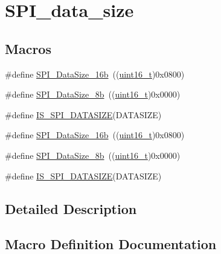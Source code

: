 \hypertarget{group___s_p_i__data__size}{}\section{S\+P\+I\+\_\+data\+\_\+size}
\label{group___s_p_i__data__size}
\subsection*{Macros}
\begin{DoxyCompactItemize}
\item 
\#define \hyperlink{group___s_p_i__data__size_ga8af2c8ca5c2162423531ebf560e0a41d}{S\+P\+I\+\_\+\+Data\+Size\+\_\+16b}~((\hyperlink{_p_e___types_8h_a1f1825b69244eb3ad2c7165ddc99c956}{uint16\+\_\+t})0x0800)
\item 
\#define \hyperlink{group___s_p_i__data__size_ga56721814a935922b6ca7c49060509765}{S\+P\+I\+\_\+\+Data\+Size\+\_\+8b}~((\hyperlink{_p_e___types_8h_a1f1825b69244eb3ad2c7165ddc99c956}{uint16\+\_\+t})0x0000)
\item 
\#define \hyperlink{group___s_p_i__data__size_gab6f9f528f7eb70373b9caf3548e44e67}{I\+S\+\_\+\+S\+P\+I\+\_\+\+D\+A\+T\+A\+S\+I\+ZE}(D\+A\+T\+A\+S\+I\+ZE)
\item 
\#define \hyperlink{group___s_p_i__data__size_ga8af2c8ca5c2162423531ebf560e0a41d}{S\+P\+I\+\_\+\+Data\+Size\+\_\+16b}~((\hyperlink{_p_e___types_8h_a1f1825b69244eb3ad2c7165ddc99c956}{uint16\+\_\+t})0x0800)
\item 
\#define \hyperlink{group___s_p_i__data__size_ga56721814a935922b6ca7c49060509765}{S\+P\+I\+\_\+\+Data\+Size\+\_\+8b}~((\hyperlink{_p_e___types_8h_a1f1825b69244eb3ad2c7165ddc99c956}{uint16\+\_\+t})0x0000)
\item 
\#define \hyperlink{group___s_p_i__data__size_gab6f9f528f7eb70373b9caf3548e44e67}{I\+S\+\_\+\+S\+P\+I\+\_\+\+D\+A\+T\+A\+S\+I\+ZE}(D\+A\+T\+A\+S\+I\+ZE)
\end{DoxyCompactItemize}


\subsection{Detailed Description}


\subsection{Macro Definition Documentation}
